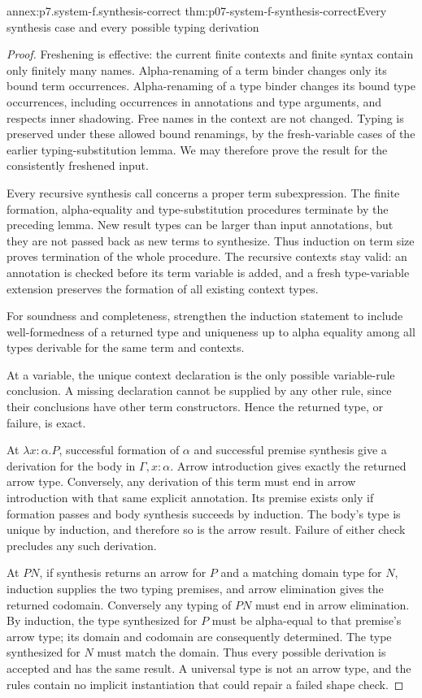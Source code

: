 \begin{annexitem}{annex:p7.system-f.synthesis-correct}
 {thm:p07-system-f-synthesis-correct}{Every synthesis case and every possible typing derivation}
\begin{proof}
Freshening is effective: the current finite contexts and finite syntax
contain only finitely many names. Alpha-renaming of a term binder changes
only its bound term occurrences. Alpha-renaming of a type binder changes
its bound type occurrences, including occurrences in annotations and
type arguments, and respects inner shadowing. Free names in the context
are not changed. Typing is preserved under these allowed bound renamings,
by the fresh-variable cases of the earlier typing-substitution lemma.
We may therefore prove the result for the consistently freshened input.

Every recursive synthesis call concerns a proper term subexpression.
The finite formation, alpha-equality and type-substitution procedures
terminate by the preceding lemma. New result types can be larger than
input annotations, but they are not passed back as new terms to synthesize.
Thus induction on term size proves termination of the whole procedure.
The recursive contexts stay valid: an annotation is checked before its
term variable is added, and a fresh type-variable extension preserves the
formation of all existing context types.

For soundness and completeness, strengthen the induction statement to
include well-formedness of a returned type and uniqueness up to alpha
equality among all types derivable for the same term and contexts.

At a variable, the unique context declaration is the only possible
variable-rule conclusion. A missing declaration cannot be supplied by
any other rule, since their conclusions have other term constructors.
Hence the returned type, or failure, is exact.

At \(\lambda x{:}\alpha.P\), successful formation of \(\alpha\)
and successful premise synthesis give a derivation for the body in
\(\Gamma,x:\alpha\). Arrow introduction gives exactly the returned
arrow type. Conversely, any derivation of this term must end in arrow
introduction with that same explicit annotation. Its premise exists
only if formation passes and body synthesis succeeds by induction.
The body's type is unique by induction, and therefore so is the arrow
result. Failure of either check precludes any such derivation.

At \(PN\), if synthesis returns an arrow for \(P\) and a matching
domain type for \(N\), induction supplies the two typing premises,
and arrow elimination gives the returned codomain. Conversely any
typing of \(PN\) must end in arrow elimination. By induction, the
type synthesized for \(P\) must be alpha-equal to that premise's
arrow type; its domain and codomain are consequently determined. The
type synthesized for \(N\) must match the domain. Thus every possible
derivation is accepted and has the same result. A universal type is
not an arrow type, and the rules contain no implicit instantiation that
could repair a failed shape check.


\end{proof}
\end{annexitem}
